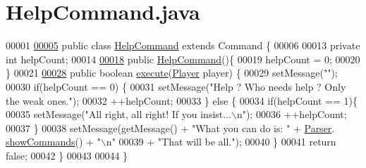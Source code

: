 \hypertarget{HelpCommand_8java_source}{\section{Help\-Command.\-java}
}

\begin{DoxyCode}
00001 
\hypertarget{HelpCommand_8java_source_l00005}{}\hyperlink{classHelpCommand}{00005} \textcolor{keyword}{public} \textcolor{keyword}{class }\hyperlink{classHelpCommand}{HelpCommand} \textcolor{keyword}{extends} Command \{
00006 
00013     \textcolor{keyword}{private} \textcolor{keywordtype}{int} helpCount;
00014 
\hypertarget{HelpCommand_8java_source_l00018}{}\hyperlink{classHelpCommand_aad2ff84710aafcbf325b91129d9827df}{00018}     \textcolor{keyword}{public} \hyperlink{classHelpCommand_aad2ff84710aafcbf325b91129d9827df}{HelpCommand}()\{
00019         helpCount = 0;
00020     \}
00021 
\hypertarget{HelpCommand_8java_source_l00028}{}\hyperlink{classHelpCommand_ac93c4d17e1bed11f86d0f3c21ba00e34}{00028}     \textcolor{keyword}{public} \textcolor{keywordtype}{boolean} \hyperlink{classHelpCommand_ac93c4d17e1bed11f86d0f3c21ba00e34}{execute}(\hyperlink{classPlayer}{Player} player) \{
00029         setMessage(\textcolor{stringliteral}{""});
00030         \textcolor{keywordflow}{if}(helpCount == 0) \{
00031             setMessage(\textcolor{stringliteral}{"Help ? Who needs help ? Only the weak ones."});
00032             ++helpCount;
00033         \} \textcolor{keywordflow}{else} \{
00034             \textcolor{keywordflow}{if}(helpCount == 1)\{
00035                 setMessage(\textcolor{stringliteral}{"All right, all right! If you insist...\(\backslash\)n"});
00036                 ++helpCount;
00037             \}
00038             setMessage(getMessage() + \textcolor{stringliteral}{"What you can do is: "} + \hyperlink{classParser}{Parser}.
      \hyperlink{classParser_a2510fee1c8d7298e222edaf1f34660dc}{showCommands}() + \textcolor{stringliteral}{"\(\backslash\)n"}
00039                     + \textcolor{stringliteral}{"That will be all."});
00040         \}
00041         \textcolor{keywordflow}{return} \textcolor{keyword}{false};
00042     \}
00043 
00044 \}
\end{DoxyCode}
